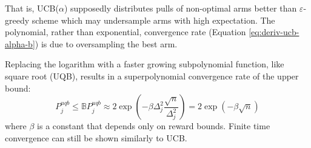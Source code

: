 \documentclass{article}
\begin{document}
That is, UCB($\alpha$) supposedly distributes pulls of non-optimal
arms better than $\varepsilon$-greedy
scheme which may undersample arms with high expectation. The
polynomial, rather than exponential, convergence rate (Equation
\ref{eq:deriv-ucb-alpha-b}) is due to oversampling the best arm.

Replacing the logarithm with a faster growing subpolynomial
function, like square root (UQB), results in a superpolynomial convergence
rate of the upper bound:
\begin{equation}
P_j^{uqb}\le\mathbb{B}P_j^{uqb}\approx2\exp\left(-\beta\Delta_j^2\frac {\sqrt n}{\Delta_j^2}\right)
            =2\exp(-\beta\sqrt n)
 \end{equation}
where $\beta$ is a constant that depends only on reward bounds.
Finite time convergence can still be shown similarly to UCB.




\end{document}
